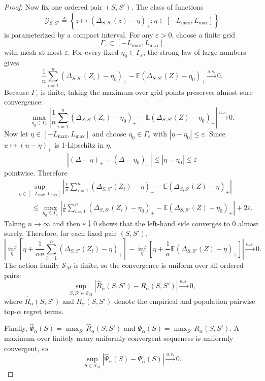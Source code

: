 \documentclass{article}
\newcommand{\EE}{\mathbb{E}}
\newcommand{\cS}{\mathcal{S}}
\newcommand{\braces}[1]{\left\{ #1 \right\}}
\newcommand{\paren}[1]{\left( #1 \right)}
\newcommand{\bracks}[1]{\left[ #1 \right]}
\newcommand{\1}{\mathbbm{1}}
\begin{document}
\begin{proof}
Now fix one ordered pair \((S,S')\). The class of functions
\[
    \mathcal{G}_{S,S'}
    \triangleq
    \braces{
        z \mapsto \paren{\Delta_{S,S'}(z)-\eta}_+ :
        \eta\in[-L_{\max},L_{\max}]
    }
\]
is parameterized by a compact interval. For any \(\varepsilon>0\), choose a finite grid
\[
    \Gamma_\varepsilon \subset [-L_{\max},L_{\max}]
\]
with mesh at most \(\varepsilon\). For every fixed \(\eta_0\in\Gamma_\varepsilon\), the strong law of large numbers gives
\[
    \frac{1}{n}\sum_{i=1}^{n}\paren{\Delta_{S,S'}(Z_i)-\eta_0}_+
    -
    \EE\paren{\Delta_{S,S'}(Z)-\eta_0}_+
    \xrightarrow[]{a.s.} 0.
\]
Because \(\Gamma_\varepsilon\) is finite, taking the maximum over grid points preserves almost-sure convergence:
\[
    \max_{\eta_0\in\Gamma_\varepsilon}
    \left|
        \frac{1}{n}\sum_{i=1}^{n}\paren{\Delta_{S,S'}(Z_i)-\eta_0}_+
        -
        \EE\paren{\Delta_{S,S'}(Z)-\eta_0}_+
    \right|
    \xrightarrow[]{a.s.} 0.
\]
Now let \(\eta\in[-L_{\max},L_{\max}]\) and choose \(\eta_0\in\Gamma_\varepsilon\) with \(|\eta-\eta_0|\le \varepsilon\). Since \(u\mapsto(u-\eta)_+\) is 1-Lipschitz in \(\eta\),
\[
    \left|
        (\Delta-\eta)_+ - (\Delta-\eta_0)_+
    \right|
    \le
    |\eta-\eta_0|
    \le
    \varepsilon
\]
pointwise. Therefore
\begin{align*}
    &\sup_{\eta\in[-L_{\max},L_{\max}]}
    \left|
        \frac{1}{n}\sum_{i=1}^{n}\paren{\Delta_{S,S'}(Z_i)-\eta}_+
        -
        \EE\paren{\Delta_{S,S'}(Z)-\eta}_+
    \right| \\
    &\qquad\le
    \max_{\eta_0\in\Gamma_\varepsilon}
    \left|
        \frac{1}{n}\sum_{i=1}^{n}\paren{\Delta_{S,S'}(Z_i)-\eta_0}_+
        -
        \EE\paren{\Delta_{S,S'}(Z)-\eta_0}_+
    \right|
    + 2\varepsilon.
\end{align*}
Taking \(n\to\infty\) and then \(\varepsilon\downarrow 0\) shows that the left-hand side converges to \(0\) almost surely. Therefore, for each fixed pair \((S,S')\),
\[
    \left|
        \inf_{\eta}
        \bracks{
            \eta + \frac{1}{\alpha n}\sum_{i=1}^{n}\paren{\Delta_{S,S'}(Z_i)-\eta}_+
        }
        -
        \inf_{\eta}
        \bracks{
            \eta + \frac{1}{\alpha}\EE\paren{\Delta_{S,S'}(Z)-\eta}_+
        }
    \right|
    \xrightarrow[]{a.s.} 0.
\]
The action family \(\cS_M\) is finite, so the convergence is uniform over all ordered pairs:
\[
    \sup_{S,S'\in\cS_M}
    \left|
        \widehat{R}_\alpha(S,S')
        -
        R_\alpha(S,S')
    \right|
    \xrightarrow[]{a.s.} 0,
\]
where \(\widehat{R}_\alpha(S,S')\) and \(R_\alpha(S,S')\) denote the empirical and population pairwise top-\(\alpha\) regret terms.

Finally, \(\widehat{\Psi}_\alpha(S)=\max_{S'}\widehat{R}_\alpha(S,S')\) and \(\Psi_\alpha(S)=\max_{S'}R_\alpha(S,S')\). A maximum over finitely many uniformly convergent sequences is uniformly convergent, so
\[
    \sup_{S\in\cS_M}
    \left|
        \widehat{\Psi}_\alpha(S)-\Psi_\alpha(S)
    \right|
    \xrightarrow[]{a.s.} 0.
\]
\end{proof}
\end{document}
